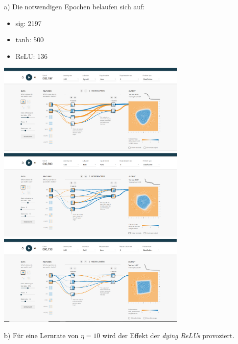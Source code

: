 \documentclass[a4paper, 11pt]{article}
\begin{document}
a) Die notwendigen Epochen belaufen sich auf:
\begin{itemize}
	\item sig: 2197
	\item tanh: 500
	\item ReLU: 136
\end{itemize}
\begin{center}
\includegraphics[width = 0.7\textwidth]{sigmoid}\\
\includegraphics[width = 0.7\textwidth]{tanh}\\
\includegraphics[width = 0.7\textwidth]{relu}\\
\end{center}

b) Für eine Lernrate von $\eta = 10$ wird der Effekt der \textit{dying ReLUs} provoziert.
\end{document}
